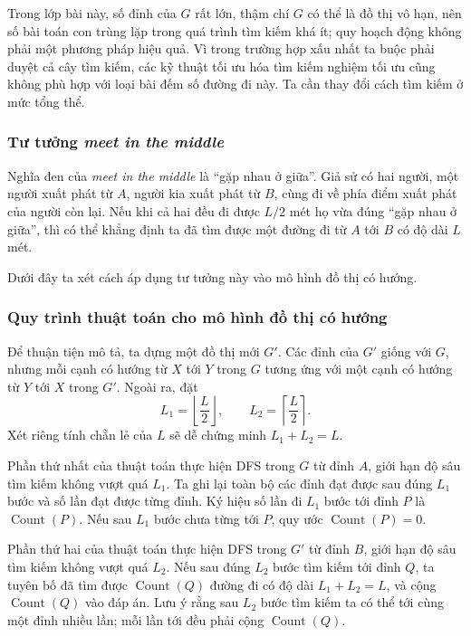 \documentclass[11pt]{article}
\begin{document}
Trong lớp bài này, số đỉnh của \(G\) rất lớn, thậm chí \(G\) có thể là đồ thị
vô hạn, nên số bài toán con trùng lặp trong quá trình tìm kiếm khá ít; quy
hoạch động không phải một phương pháp hiệu quả. Vì trong trường hợp xấu nhất
ta buộc phải duyệt cả cây tìm kiếm, các kỹ thuật tối ưu hóa tìm kiếm nghiệm
tối ưu cũng không phù hợp với loại bài đếm số đường đi này. Ta cần thay đổi
cách tìm kiếm ở mức tổng thể.

\subsubsection{Tư tưởng \emph{meet in the middle}}

Nghĩa đen của \emph{meet in the middle} là ``gặp nhau ở giữa''. Giả sử có hai
người, một người xuất phát từ \(A\), người kia xuất phát từ \(B\), cùng đi về
phía điểm xuất phát của người còn lại. Nếu khi cả hai đều đi được \(L/2\) mét
họ vừa đúng ``gặp nhau ở giữa'', thì có thể khẳng định ta đã tìm được một
đường đi từ \(A\) tới \(B\) có độ dài \(L\) mét.

Dưới đây ta xét cách áp dụng tư tưởng này vào mô hình đồ thị có hướng.

\subsubsection{Quy trình thuật toán cho mô hình đồ thị có hướng}

Để thuận tiện mô tả, ta dựng một đồ thị mới \(G'\). Các đỉnh của \(G'\) giống
với \(G\), nhưng mỗi cạnh có hướng từ \(X\) tới \(Y\) trong \(G\) tương ứng
với một cạnh có hướng từ \(Y\) tới \(X\) trong \(G'\). Ngoài ra, đặt
\[
  L_1=\left\lfloor\frac{L}{2}\right\rfloor,\qquad
  L_2=\left\lceil\frac{L}{2}\right\rceil.
\]
Xét riêng tính chẵn lẻ của \(L\) sẽ dễ chứng minh \(L_1+L_2=L\).

Phần thứ nhất của thuật toán thực hiện DFS trong \(G\) từ đỉnh \(A\), giới
hạn độ sâu tìm kiếm không vượt quá \(L_1\). Ta ghi lại toàn bộ các đỉnh đạt
được sau đúng \(L_1\) bước và số lần đạt được từng đỉnh. Ký hiệu số lần đi
\(L_1\) bước tới đỉnh \(P\) là \(\operatorname{Count}(P)\). Nếu sau
\(L_1\) bước chưa từng tới \(P\), quy ước \(\operatorname{Count}(P)=0\).

Phần thứ hai của thuật toán thực hiện DFS trong \(G'\) từ đỉnh \(B\), giới
hạn độ sâu tìm kiếm không vượt quá \(L_2\). Nếu sau đúng \(L_2\) bước tìm
kiếm tới đỉnh \(Q\), ta tuyên bố đã tìm được
\(\operatorname{Count}(Q)\) đường đi có độ dài \(L_1+L_2=L\), và cộng
\(\operatorname{Count}(Q)\) vào đáp án. Lưu ý rằng sau \(L_2\) bước tìm kiếm
ta có thể tới cùng một đỉnh nhiều lần; mỗi lần tới đều phải cộng
\(\operatorname{Count}(Q)\).
\end{document}
